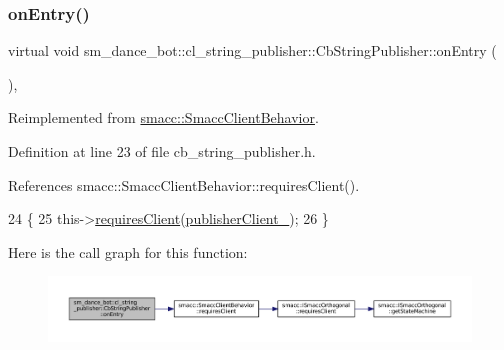 \subsubsection{\texorpdfstring{on\+Entry()}{onEntry()}}
{\footnotesize\ttfamily virtual void sm\+\_\+dance\+\_\+bot\+::cl\+\_\+string\+\_\+publisher\+::\+Cb\+String\+Publisher\+::on\+Entry (\begin{DoxyParamCaption}{ }\end{DoxyParamCaption})\hspace{0.3cm}{\ttfamily [inline]}, {\ttfamily [virtual]}}



Reimplemented from \hyperlink{classsmacc_1_1SmaccClientBehavior_a7962382f93987c720ad432fef55b123f}{smacc\+::\+Smacc\+Client\+Behavior}.



Definition at line 23 of file cb\+\_\+string\+\_\+publisher.\+h.



References smacc\+::\+Smacc\+Client\+Behavior\+::requires\+Client().


\begin{DoxyCode}
24     \{
25         this->\hyperlink{classsmacc_1_1SmaccClientBehavior_a917f001e763a1059af337bf4e164f542}{requiresClient}(\hyperlink{classsm__dance__bot_1_1cl__string__publisher_1_1CbStringPublisher_aafcad6e6296a3088cb91ffeb22025bd6}{publisherClient\_});
26     \}
\end{DoxyCode}
Here is the call graph for this function\+:
\nopagebreak
\begin{figure}[H]
\begin{center}
\leavevmode
\includegraphics[width=350pt]{classsm__dance__bot_1_1cl__string__publisher_1_1CbStringPublisher_a7aa533578e820ee90d92d15b85d42e9b_cgraph}
\end{center}
\end{figure}
\mbox{\label{classsm__dance__bot_1_1cl__string__publisher_1_1CbStringPublisher_ac93cc1eb150140331cb3e560ec8249e2}} 
